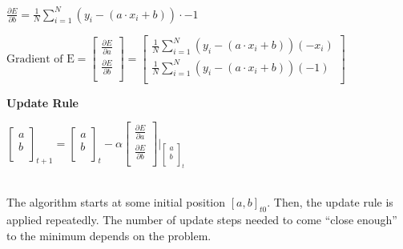 \begin{center}
    $\frac{\partial E}{\partial b} = \frac{1}{N}\sum_{i=1}^N (y_i - (a \cdot x_i + b)) \cdot -1$
\end{center}

\begin{center}
    $
     \textrm{Gradient of E} = \begin{bmatrix}
                                  \frac{\partial E}{\partial a} \\
                                  \frac{\partial E}{\partial b} \\
     \end{bmatrix}
     =\begin{bmatrix}
          \frac{1}{N}\sum_{i=1}^N (y_i - (a \cdot x_i + b))(-x_i) \\
          \frac{1}{N}\sum_{i=1}^N (y_i - (a \cdot x_i + b))(-1) \\
     \end{bmatrix}
    $
\end{center}

\textbf{Update Rule}

\begin{center}
    $
    \begin{bmatrix}
        a \\
        b \\
    \end{bmatrix}_{t+1}
    =    \begin{bmatrix}
             a \\
             b \\
    \end{bmatrix}_{t} - \alpha
    \begin{bmatrix}
        \frac{\partial E}{\partial a} \\
        \frac{\partial E}{\partial b} \\
    \end{bmatrix} \Big\rvert _{\begin{bmatrix}
                                   a \\
                                   b \\
    \end{bmatrix}_{t} }
    $
\end{center}
\\
The algorithm starts at some initial position $[a, b]_{t0}$.
Then, the update rule is applied repeatedly.
The number of update steps needed to come ``close enough'' to the minimum depends on the problem.

